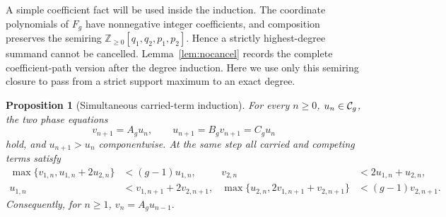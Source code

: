\documentclass[11pt]{article}
\newtheorem{proposition}[theorem]{Proposition}
\theoremstyle{remark}
\numberwithin{equation}{section}
\begin{document}
A simple coefficient fact will be used inside the induction.  The coordinate
polynomials of $F_g$ have nonnegative integer coefficients, and composition
preserves the semiring
$\mathbb Z_{\geq0}[q_1,q_2,p_1,p_2]$.  Hence a strictly highest-degree
summand cannot be cancelled.  Lemma~\ref{lem:nocancel} records the complete
coefficient-path version after the degree induction.  Here we use only this
semiring closure to pass from a strict support maximum to an exact degree.

\begin{proposition}[Simultaneous carried-term induction]\label{prop:oldterms}
For every $n\geq0$, $u_n\in\mathcal{C}_g$, the two phase equations
\[
 v_{n+1}=A_gu_n,\qquad u_{n+1}=B_gv_{n+1}=C_gu_n
\]
hold, and $u_{n+1}>u_n$ componentwise.  At the same step all carried and
competing terms satisfy
\begin{align}
 \max\{v_{1,n},u_{1,n}+2u_{2,n}\}
   &<(g-1)u_{1,n},&
 v_{2,n}&<2u_{1,n}+u_{2,n},\label{eq:oldS}\\
 u_{1,n}&<v_{1,n+1}+2v_{2,n+1},&
 \max\{u_{2,n},2v_{1,n+1}+v_{2,n+1}\}
   &<(g-1)v_{2,n+1}.\label{eq:oldT}
\end{align}
Consequently, for $n\geq1$, $v_n=A_gu_{n-1}$.
\end{proposition}
\end{document}
